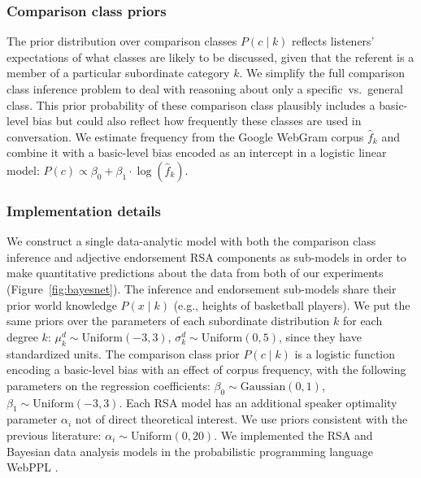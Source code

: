 \documentclass[doc]{apa6}
\begin{document}
\subsubsection{Comparison class priors}

The prior distribution over comparison classes $P(c \mid k)$ reflects listeners' expectations of what classes are likely to be discussed, given that the referent is a member of a particular subordinate category $k$.
We simplify the full comparison class inference problem to deal with reasoning about only a specific~vs.~general class.
This prior probability of these comparison class plausibly includes a basic-level bias \cite{rosch1975family} but could also reflect how frequently these classes are used in conversation.
We estimate frequency from the Google WebGram corpus $\hat{f}_k$ and combine it with a basic-level bias encoded as an intercept in a logistic linear model: $P(c) \propto \beta_0 + \beta_1 \cdot \log (\hat{f}_k)$.


\subsubsection{Implementation details}

We construct a single data-analytic model with both the comparison class inference and adjective endorsement RSA components as sub-models in order to make quantitative predictions about the data from both of our experiments (Figure~\ref{fig:bayesnet}).
The inference and endorsement sub-models share their prior world knowledge $P(x \mid k)$ (e.g., heights of basketball players).
We put the same priors over the parameters of each subordinate distribution $k$ for each degree $k$: $\mu^d_k \sim \text{Uniform}(-3, 3)$, $\sigma^d_k \sim \text{Uniform}(0, 5)$, since they have standardized units.
The comparison class prior $P(c \mid k)$ is a logistic function encoding a basic-level bias with an effect of corpus frequency, with the following parameters on the regression coefficients:  $\beta_0 \sim \text{Gaussian}(0, 1)$, $\beta_1 \sim \text{Uniform}(-3, 3)$. 
Each RSA model has an additional speaker optimality parameter $\alpha_{i}$ not of direct theoretical interest.
We use priors consistent with the previous literature: $\alpha_i \sim \text{Uniform}(0, 20)$.
We implemented the RSA and Bayesian data analysis models in the probabilistic programming language WebPPL \cite{dippl}.
\end{document}
